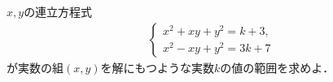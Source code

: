 \documentclass[8pt,dvipdfmx]{article}
\begin{document}
\begin{tcolorbox}[title=数学\textcircled{1} 3-3 BC]
\(x, y\)の連立方程式
\begin{align*}
\begin{cases}
x^2+xy+y^2 =k+3 ,\\
x^2-xy+y^2=3k+7
\end{cases}
\end{align*}
が実数の組\((x,y)\)を解にもつような実数$k$の値の範囲を求めよ．
\end{tcolorbox}



\end{document}
